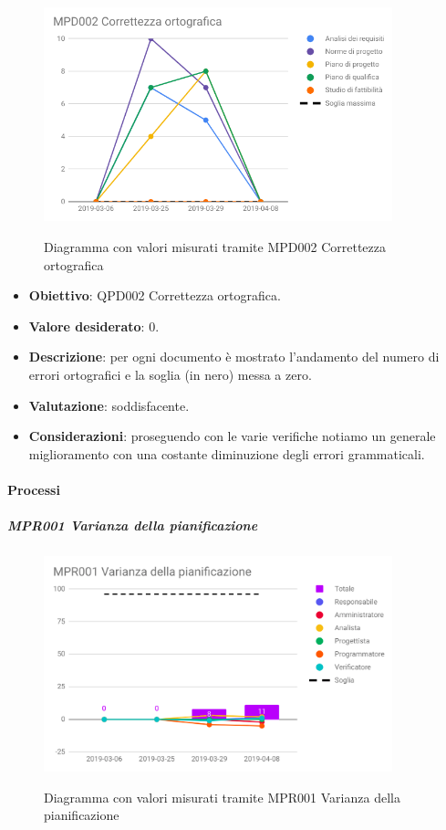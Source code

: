		\begin{figure}[H]
			\centering
			\includegraphics[width=0.9\textwidth]{img/cruscotti/RQ/MPD002.png}
			\label{immagineCorrettezzaOrtograficaRQ}
			\caption{Diagramma con valori misurati tramite MPD002 Correttezza ortografica}
		\end{figure}

		\begin{itemize}
			\item \textbf{Obiettivo}: QPD002 Correttezza ortografica.
			\item \textbf{Valore desiderato}: 0.
			\item \textbf{Descrizione}: per ogni documento è mostrato l'andamento del numero di errori ortografici e la soglia (in nero) messa a zero.
			\item \textbf{Valutazione}: soddisfacente.
			\item \textbf{Considerazioni}: proseguendo con le varie verifiche notiamo un generale
			miglioramento con una costante diminuzione degli errori grammaticali.
		\end{itemize}
	
	\paragraph{Processi}
	
	\subparagraph{MPR001 Varianza della pianificazione}
	
	\begin{figure}[H]
		\centering
		\includegraphics[width=0.9\textwidth]{img/cruscotti/RQ/MPR001.png}
		\label{immagineVarianzaPianificazioneRQ}
		\caption{Diagramma con valori misurati tramite MPR001 Varianza della pianificazione}
	\end{figure}
	
